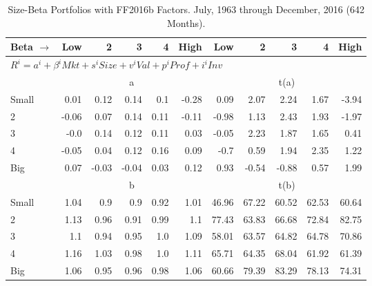 
\begin{table}[!ht]
\centering
\caption{Size-Beta Portfolios with FF2016b Factors. \footnotesize{July, 1963 through December, 2016 (642 Months).}}
\begin{tabular}{lrrrrrrrrrr}
  \toprule
    Beta $\rightarrow$ & Low & 2 & 3 & 4 & High & Low & 2 & 3 & 4 & High \\ 
  \midrule
  \multicolumn{11}{l}{$R^i=a^i+\beta^iMkt+s^iSize+v^iVal+p^iProf+i^iInv$} \\

  
    
      & \multicolumn{5}{c}{a} & \multicolumn{5}{c}{t(a)}
    
    \\
      \cmidrule(r){2-6} \cmidrule(r){7-11}

    Small   & 0.01  & 0.12  & 0.14  & 0.1  & -0.28  & 0.09  & 2.07  & 2.24  & 1.67  & -3.94  \\
         2  & -0.06  & 0.07  & 0.14  & 0.11  & -0.11  & -0.98  & 1.13  & 2.43  & 1.93  & -1.97  \\
         3  & -0.0  & 0.14  & 0.12  & 0.11  & 0.03  & -0.05  & 2.23  & 1.87  & 1.65  & 0.41  \\
         4  & -0.05  & 0.04  & 0.12  & 0.16  & 0.09  & -0.7  & 0.59  & 1.94  & 2.35  & 1.22  \\
    Big     & 0.07  & -0.03  & -0.04  & 0.03  & 0.12  & 0.93  & -0.54  & -0.88  & 0.57  & 1.99  \\

  
    
      & \multicolumn{5}{c}{b} & \multicolumn{5}{c}{t(b)}
    
    \\
      \cmidrule(r){2-6} \cmidrule(r){7-11}

    Small   & 1.04  & 0.9  & 0.9  & 0.92  & 1.01  & 46.96  & 67.22  & 60.52  & 62.53  & 60.64  \\
         2  & 1.13  & 0.96  & 0.91  & 0.99  & 1.1  & 77.43  & 63.83  & 66.68  & 72.84  & 82.75  \\
         3  & 1.1  & 0.94  & 0.95  & 1.0  & 1.09  & 58.01  & 63.57  & 64.82  & 64.78  & 70.86  \\
         4  & 1.16  & 1.03  & 0.98  & 1.0  & 1.11  & 65.71  & 64.35  & 68.04  & 61.92  & 61.39  \\
    Big     & 1.06  & 0.95  & 0.96  & 0.98  & 1.06  & 60.66  & 79.39  & 83.29  & 78.13  & 74.31  \\

  
    

\end{tabular}
\end{table}
